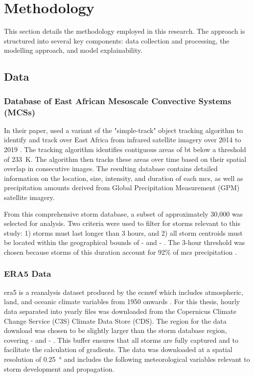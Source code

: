 \chapter{Methodology}
\label{ch:method}

This section details the methodology employed in this research. The approach is structured into several key components: data collection and processing, the modelling approach, and model explainability.

\section{Data}

\subsection{Database of East African Mesoscale Convective Systems (MCSs)}

In their paper, \cite{Hill2023} used a variant of the "simple-track" object tracking algorithm to identify and track  over East Africa from infrared satellite imagery over 2014 to 2019 \citep{Stein2020}. The tracking algorithm identifies contiguous areas of \acrfull{bt} below a threshold of \SI{233}{\kelvin}. The algorithm then tracks these areas over time based on their spatial overlap in consecutive images. The resulting database contains detailed information on the location, size, intensity, and duration of each \acrshort{mcs}, as well as precipitation amounts derived from Global Precipitation Measurement (GPM) satellite imagery.

From this comprehensive storm database, a subset of approximately 30,000 was selected for analysis. Two criteria were used to filter for storms relevant to this study: 1) storms must last longer than 3 hours, and 2) all storm centroids must be located within the geographical bounds of  -  and  - . The 3-hour threshold was chosen because storms of this duration account for 92\% of \acrshort{mcs} precipitation \citep{Hill2023}.

\subsection{ERA5 Data}

\acrfull{era5} is a reanalysis dataset produced by the \acrfull{ecmwf} which includes atmospheric, land, and oceanic climate variables from 1950 onwards \citep{Hersbach2020}. For this thesis, hourly data separated into yearly files was downloaded from the Copernicus Climate Change Service (C3S) Climate Data Store (CDS). The region for the data download was chosen to be slightly larger than the storm database region, covering  -  and  - . This buffer ensures that all storms are fully captured and to facilitate the calculation of gradients. The data was downloaded at a spatial resolution of \SI{0.25}{\degree} and includes the following meteorological variables relevant to storm development and propagation.

